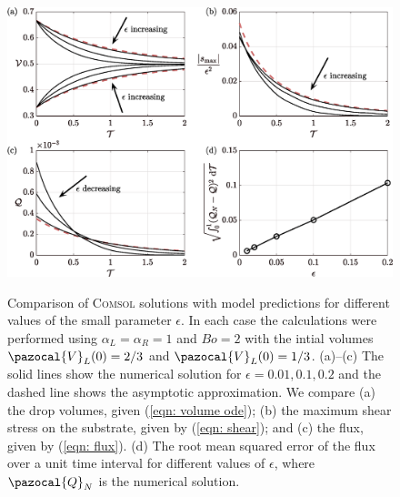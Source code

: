 \documentclass{jfm}
\begin{document}
 
 
\begin{figure} 
\centering
 {\includegraphics[width=1\linewidth]{Figures/Numerical_Validation_V2a.eps}}  
  \caption{
Comparison of \textsc{Comsol}    solutions with model predictions for different values of the small parameter $\epsilon$. 
In each case   the calculations were performed using  $\alpha_{L} = \alpha_{R} = 1$ and  $Bo=2$ with the intial volumes  $\pazocal{V}_L(0) = 2/3$  and    $\pazocal{V}_L(0) = 1/3$. 
(a)--(c) The solid lines show the numerical solution for   $\epsilon = 0.01,0.1,0.2 $  and the dashed line shows the  asymptotic approximation.
We compare  (a) the drop volumes,  given  (\ref{eqn: volume ode});   (b)  the maximum shear stress on the substrate, given by (\ref{eqn: shear}); and (c) the flux, given by (\ref{eqn: flux}).
(d) The root mean squared error of the flux over a unit time interval for different values of $\epsilon$, where $\pazocal{Q}_N$ is the numerical solution.
    } \label{fig: validation}
\end{figure}



 
\end{document}
